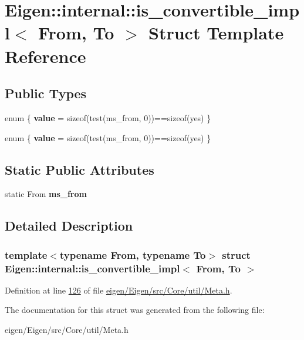 \hypertarget{struct_eigen_1_1internal_1_1is__convertible__impl}{}\section{Eigen\+:\+:internal\+:\+:is\+\_\+convertible\+\_\+impl$<$ From, To $>$ Struct Template Reference}
\label{struct_eigen_1_1internal_1_1is__convertible__impl}
\subsection*{Public Types}
\begin{DoxyCompactItemize}
\item 
\mbox{\label{struct_eigen_1_1internal_1_1is__convertible__impl_a86e717fa88edf3585e423804ca82e396}} 
enum \{ {\bfseries value} = sizeof(test(ms\+\_\+from, 0))==sizeof(yes)
 \}
\item 
\mbox{\label{struct_eigen_1_1internal_1_1is__convertible__impl_a21dc0971c4a5f441ad18d73fcab82a3b}} 
enum \{ {\bfseries value} = sizeof(test(ms\+\_\+from, 0))==sizeof(yes)
 \}
\end{DoxyCompactItemize}
\subsection*{Static Public Attributes}
\begin{DoxyCompactItemize}
\item 
\mbox{\label{struct_eigen_1_1internal_1_1is__convertible__impl_affd4a5100faa3893f9344e4a74a1c2d0}} 
static From {\bfseries ms\+\_\+from}
\end{DoxyCompactItemize}


\subsection{Detailed Description}
\subsubsection*{template$<$typename From, typename To$>$\newline
struct Eigen\+::internal\+::is\+\_\+convertible\+\_\+impl$<$ From, To $>$}



Definition at line \hyperlink{eigen_2_eigen_2src_2_core_2util_2_meta_8h_source_l00126}{126} of file \hyperlink{eigen_2_eigen_2src_2_core_2util_2_meta_8h_source}{eigen/\+Eigen/src/\+Core/util/\+Meta.\+h}.



The documentation for this struct was generated from the following file\+:\begin{DoxyCompactItemize}
\item 
eigen/\+Eigen/src/\+Core/util/\+Meta.\+h\end{DoxyCompactItemize}
